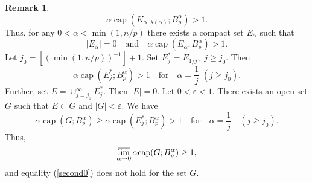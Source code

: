 \documentclass[12pt,twoside,reqno]{amsart}
\numberwithin{equation}{section}
\theoremstyle{definition}
\newtheorem{rem}[teo]{Remark}
\numberwithin{equation}{section}
\begin{document}
\begin{rem}
$${\alpha}{\operatorname{cap}}(K_{{\alpha},{\lambda }({\alpha})}; B_p^{\alpha})>1.
$$
Thus, for
any $0<{\alpha}<\min(1, n/p)$ there exists a compact set $E_{\alpha}$ such that
$$
|E_{\alpha}|=0 \quad \mbox{and}\quad {\alpha}{\operatorname{cap}}(E_{\alpha}; B_p^{\alpha})>1.
$$
Let $j_0=[(\min(1, n/p))^{-1}]+1.$ Set
$E^*_j=E_{1/j}, \,\, j\ge j_0.$ Then
$$
{\alpha} {\operatorname{cap}}(E^*_j; B_p^{\alpha})>1 \quad\mbox{for} \quad {\alpha} =\frac1j\,\, (j\ge j_0).
$$
Further, set  $E=\cup_{j=j_0}^\infty E^*_j.$
Then $|E|=0$.
Let $0<{\varepsilon}<1$.
There exists an open set $G$ such that $E\subset G$ and $|G|<{\varepsilon}.$ We have
$$
{\alpha} {\operatorname{cap}}(G; B_p^{\alpha})\ge {\alpha} {\operatorname{cap}}(E^*_j; B_p^{\alpha})>1 \quad\mbox{for} \quad {\alpha} =\frac1j\quad (j\ge j_0).
$$
Thus,
$$
\varlimsup_{{\alpha}\to 0}{\alpha} {\operatorname{cap}}(G; B_p^{\alpha})\ge 1,
$$
and equality (\ref{second0}) does not hold for the set $G$.

\end{rem}
\end{document}
